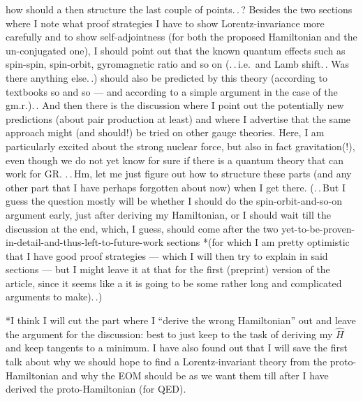 \documentclass{report}
\begin{document}
how should a then structure the last couple of points.\,.\,? Besides the two sections where I note what proof strategies I have to show Lorentz-invariance more carefully and to show self-adjointness (for both the proposed Hamiltonian and the un-conjugated one), I should point out that the known quantum effects such as spin-spin, spin-orbit, gyromagnetic ratio and so on (.\,.\,i.e.\ and Lamb shift.\,. Was there anything else.\,.) should also be predicted by this theory (according to textbooks so and so --- and according to a simple argument in the case of the gm.r.).\,. And then there is the discussion where I point out the potentially new predictions (about pair production at least) and where I advertise that the same approach might (and should!) be tried on other gauge theories. Here, I am particularly excited about the strong nuclear force, but also in fact gravitation(!), even though we do not yet know for sure if there is a quantum theory that can work for GR. .\,.\,Hm, let me just figure out how to structure these parts (and any other part that I have perhaps forgotten about now) when I get there. (.\,.\,But I guess the question mostly will be whether I should do the spin-orbit-and-so-on argument early, just after deriving my Hamiltonian, or I should wait till the discussion at the end, which, I guess, should come after the two yet-to-be-proven-in-detail-and-thus-left-to-future-work sections *(for which I am pretty optimistic that I have good proof strategies --- which I will then try to explain in said sections --- but I might leave it at that for the first (preprint) version of the article, since it seems like a it is going to be some rather long and complicated arguments to make).\,.) %

*I think I will cut the part where I ``derive the wrong Hamiltonian'' out and leave the argument for the discussion: best to just keep to the task of deriving my $\hat H$ and keep tangents to a minimum. I have also found out that I will save the first talk about why we should hope to find a Lorentz-invariant theory from the proto-Hamiltonian and why the EOM should be as we want them till after I have derived the proto-Hamiltonian (for QED).
\end{document}
